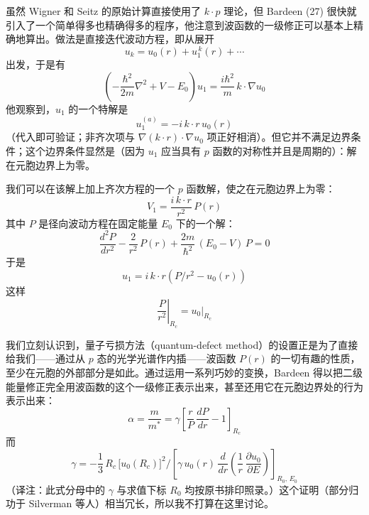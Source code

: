 虽然 Wigner 和 Seitz 的原始计算直接使用了 $k\cdot p$ 理论，但 Bardeen (27) 很快就引入了一个简单得多也精确得多的程序，他注意到波函数的一级修正可以基本上精确地算出。做法是直接迭代波动方程，即从展开
\begin{equation*}
u_k=u_0(r)+u_1^{\,k}(r)+\cdots
\end{equation*}
出发，于是有
\begin{equation*}
\left(-\frac{\hbar^2}{2m}\nabla^2+V-E_0\right)u_1=\frac{i\hbar^2}{m}\,k\cdot\nabla u_0
\end{equation*}
他观察到，$u_1$ 的一个特解是
\begin{equation*}
u_1^{(a)}=-i\,k\cdot r\,u_0(r)
\end{equation*}
（代入即可验证；非齐次项与 $\nabla(k\cdot r)\cdot\nabla u_0$ 项正好相消）。但它并不满足边界条件；这个边界条件显然是（因为 $u_1$ 应当具有 $p$ 函数的对称性并且是周期的）：解在元胞边界上为零。

我们可以在该解上加上齐次方程的一个 $p$ 函数解，使之在元胞边界上为零：
\begin{equation*}
V_1=\frac{i\,k\cdot r}{r^2}\,P(r)
\end{equation*}
其中 $P$ 是径向波动方程在固定能量 $E_0$ 下的一个解：
\begin{equation*}
\frac{d^2 P}{dr^2}-\frac{2}{r^2}\,P(r)+\frac{2m}{\hbar^2}\,(E_0-V)\,P=0
\end{equation*}
于是
\begin{equation*}
u_1=i\,k\cdot r\left(P/r^2-u_0(r)\right)
\end{equation*}
这样
\begin{equation*}
\left.\frac{P}{r^2}\right|_{R_c}=\left.u_0\right|_{R_c}
\end{equation*}

我们立刻认识到，量子亏损方法（quantum-defect method）的设置正是为了直接给我们——通过从 $p$ 态的光学光谱作内插——波函数 $P(r)$ 的一切有趣的性质，至少在元胞的外部部分是如此。通过运用一系列巧妙的变换，Bardeen 得以把二级能量修正完全用波函数的这个一级修正表示出来，甚至还用它在元胞边界处的行为表示出来：
\begin{equation*}
\alpha=\frac{m}{m^*}=\gamma\left[\frac{r}{P}\,\frac{dP}{dr}-1\right]_{R_c}
\end{equation*}
而
\begin{equation*}
\gamma=-\frac{1}{3}\,R_c\,\bigl[u_0(R_c)\bigr]^2\Bigg/\left[\gamma\,u_0(r)\,\frac{d}{dr}\left(\frac{1}{r}\,\frac{\partial u_0}{\partial E}\right)\right]_{R_0,\,E_0}
\end{equation*}
（译注：此式分母中的 $\gamma$ 与求值下标 $R_0$ 均按原书排印照录。）这个证明（部分归功于 Silverman 等人）相当冗长，所以我不打算在这里讨论。

